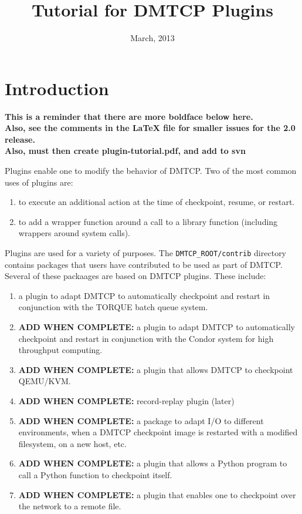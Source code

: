 \documentclass{article}
\title{Tutorial for DMTCP Plugins}
\author{}
\date{March, 2013}
\begin{document}
\maketitle
\tableofcontents

\section{Introduction}

{\bf This is a reminder that there are more boldface below here. \\
  Also, see the comments in the LaTeX file for smaller issues for the 2.0 release. \\
  Also, must then create plugin-tutorial.pdf, and add to svn
}

Plugins enable one to modify the behavior of DMTCP.  Two of the most
common uses of plugins are:
\begin{enumerate}
\item to execute an additional action at the time of checkpoint, resume,
	or restart.
\item to add a wrapper function around a call to a library function (including
	wrappers around system calls).
\end{enumerate}

Plugins are used for a variety of purposes. The {\tt DMTCP\_ROOT/contrib} directory
contains packages that users have contributed to be used as part of DMTCP.
Several of these packaages are based on DMTCP plugins.  These include:
\begin{enumerate}
  \item a plugin to adapt DMTCP to automatically checkpoint and restart in
	conjunction with the TORQUE batch queue system.
  \item {\bf ADD WHEN COMPLETE:} a plugin to adapt DMTCP to automatically
	checkpoint and restart in conjunction with the Condor system
	for high throughput computing.
  \item {\bf ADD WHEN COMPLETE:} a plugin that allows DMTCP to checkpoint QEMU/KVM.
  \item {\bf ADD WHEN COMPLETE:} record-replay plugin  (later)
  \item {\bf ADD WHEN COMPLETE:} a package to adapt I/O to different
	environments, when a DMTCP checkpoint image is restarted with a
	modified filesystem, on a new host, etc.
  \item {\bf ADD WHEN COMPLETE:} a plugin that allows a Python program
	to call a Python function to checkpoint itself.
  \item {\bf ADD WHEN COMPLETE:} a plugin that enables one to checkpoint
	over the network to a remote file.
\end{enumerate}
\end{document}
